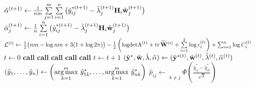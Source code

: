 \begin{algorithm}[H]
\begin{algorithmic}[1]
    \State $\tilde\alpha^{(t+1)} \gets \frac{1}{nm} \sum\limits_{j=1}^m \sum\limits_{i=1}^n \big(\tilde y_{ij}^{*(t+1)} - \tilde\lambda_j^{(t+1)} {\mathbf H}_i \tilde{{\mathbf w}}_j^{(t+1)}\big)$
  \Else
      \State $\tilde\alpha_j^{(t+1)} \gets \frac{1}{n} \sum\limits_{i=1}^n \big(\tilde y_{ij}^{*(t+1)} - \tilde\lambda_j^{(t+1)} {\mathbf H}_i \tilde{{\mathbf w}}_j^{(t+1)}\big)$
    \EndFor
  \EndIf
\EndProcedure	
\Statex
{}
  \State ${\mathcal L}^{(t)} \gets \frac{1}{2} \big(nm - \log nm + 3(1 + \log 2\pi) \big) 
  - \frac{1}{2} \left( \text{logdetA}^{(t)} + \operatorname{tr} {\widetilde{{\mathbf W}}}^{(t)} + \sum\limits_{i=1}^2 \log c_i^{(t)} \right) + \sum_{i=1}^n \log C_i^{(t)}$
\EndProcedure	
\Statex
{}
  \State $t \gets 0$
    \State \textbf{call} 
    \State \textbf{call} 
    \State \textbf{call} 
    \State \textbf{call} 
    \State \textbf{call} 
    \State $t \gets t + 1$
  \EndWhile
\EndProcedure
\Statex
\State \Return $(\hat\by^*, \hat\bw, \hat\lambda, \hat\alpha) \gets (\tilde\by^{*(t)}, \tilde\bw^{(t)}, \tilde\lambda^{(t)}, \tilde\alpha^{(t)}) \vspace{1mm}$ 
\State \Return $(\hat y_1, \dots, \hat y_n) \gets \left(\argmax\limits_{k=1}^m \, \hat y_{1k}^*, \dots, \argmax\limits_{k=1}^m \, \hat y_{nk}^* \right) \vspace{1mm}$ 
    \State \Return $\hat p_{ij} \gets \mathop{\prod\limits_{k=1}^m}\limits_{k\neq j} \Phi \left(\frac{\hat y_{ij}^* - \hat y_{ik}^*}{\surd 2} \right) $ 
  \EndFor
\EndFor
\end{algorithmic}
\end{algorithm}
